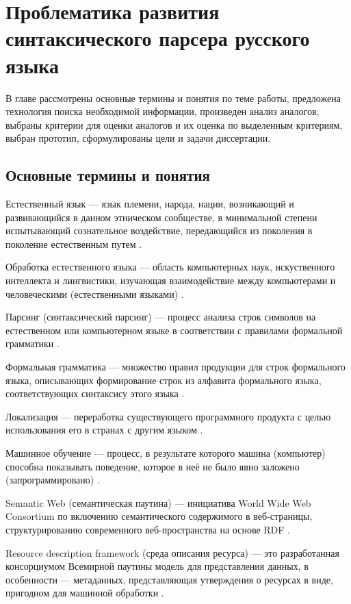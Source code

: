\indent \section{Проблематика развития синтаксического парсера русского языка}
В главе рассмотрены основные термины и понятия по теме работы, предложена технология поиска необходимой информации, произведен анализ аналогов, выбраны критерии для оценки аналогов и их оценка по выделенным критериям, выбран прототип, сформулированы цели и задачи диссертации.

\subsection{Основные термины и понятия}
Естественный язык --- язык племени, народа, нации, возникающий и развивающийся в данном этническом сообществе, в минимальной степени испытывающий сознательное воздействие, передающийся из поколения в поколение естественным путем \cite{academica_nl}.

Обработка естественного языка --- область компьютерных наук, искуственного интеллекта и лингвистики, изучающая взаимодействие между компьютерами и человеческими (естественными языками) \cite{wiki_nlp}.

Парсинг (синтаксический парсинг) --- процесс анализа строк символов на естественном или компьютерном языке в соответствии с правилами формальной грамматики \cite{wiki_parsing}.

Формальная грамматика --- множество правил продукции для строк формального языка, описывающих формирование строк из алфавита формального языка, соответствующих синтаксису этого языка \cite{wiki_fg}.

Локализация --- переработка существующего программного продукта с целью использования его в странах с другим языком \cite{academica_loc}.

Машинное обучение --- процесс, в результате которого машина (компьютер) способна показывать поведение, которое в неё не было явно заложено (запрограммировано) \cite{samuel}.

Semantic Web (семантическая паутина) --- инициатива World Wide Web Consortium по включению семантического содержимого в веб-страницы, структурированию современного веб-пространства на основе RDF \cite{wiki_semantic_web}.

Resource description framework (среда описания ресурса) --- это разработанная консорциумом Всемирной паутины модель для представления данных, в особенности --- метаданных, представляющая утверждения о ресурсах в виде, пригодном для машинной обработки \cite{wiki_rdf}. 


